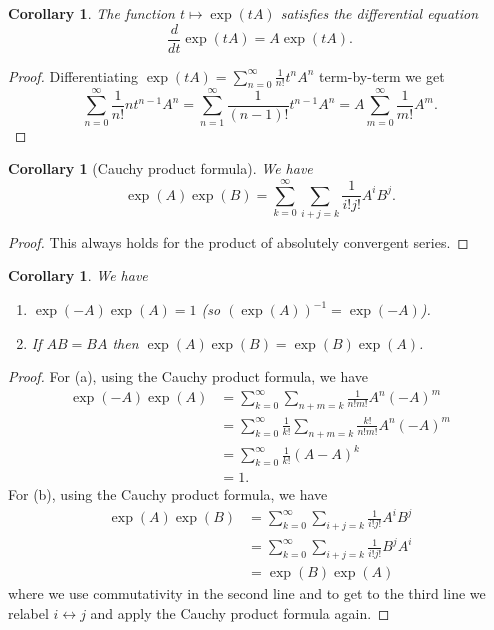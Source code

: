 \documentclass[12pt]{article}
\newtheorem{cor}[thm]{Corollary}
\theoremstyle{definition}
\theoremstyle{check}
\theoremstyle{remark}
\theoremstyle{TheoremNum}
\begin{document}
\begin{cor}
The function $t\mapsto \exp(tA)$ satisfies the differential equation
\[\frac{d}{dt}\exp(tA)=A\exp(tA).\]
\end{cor}
\begin{proof}
Differentiating $\exp(tA)=\sum_{n=0}^{\infty}\frac{1}{n!}t^nA^n$ term-by-term we get
\[\sum_{n=0}^{\infty}\frac{1}{n!}nt^{n-1}A^n=\sum_{n=1}^{\infty}\frac{1}{(n-1)!}t^{n-1}A^n=A\sum_{m=0}^{\infty}\frac{1}{m!}A^m.\]
\end{proof}

\begin{cor}[Cauchy product formula]
We have
\[\exp(A)\exp(B)=\sum_{k=0}^{\infty}\sum_{i+j=k}\frac{1}{i!j!}A^iB^j.\]
\end{cor}
\begin{proof}
This always holds for the product of absolutely convergent series.
\end{proof}

\begin{cor}
We have
\begin{enumerate}
\item[(a)] $\exp(-A)\exp(A)=1$ (so $(\exp(A))^{-1}=\exp(-A)$).
\item[(b)] If $AB=BA$ then $\exp(A)\exp(B)=\exp(B)\exp(A)$.
\end{enumerate}
\end{cor}
\begin{proof}
For (a), using the Cauchy product formula, we have
\begin{align*}
\exp(-A)\exp(A)&=\sum_{k=0}^{\infty}\sum_{n+m=k}\frac{1}{n!m!}A^n(-A)^m\\
               &=\sum_{k=0}^{\infty}\frac{1}{k!}\sum_{n+m=k}\frac{k!}{n!m!}A^n(-A)^m\\
               &=\sum_{k=0}^{\infty}\frac{1}{k!}(A-A)^k\\
               &=1.
\end{align*}
For (b), using the Cauchy product formula, we have
\begin{align*}
\exp(A)\exp(B)&=\sum_{k=0}^{\infty}\sum_{i+j=k}\frac{1}{i!j!}A^iB^j\\
              &=\sum_{k=0}^{\infty}\sum_{i+j=k}\frac{1}{i!j!}B^jA^i\\
              &=\exp(B)\exp(A)
\end{align*}
where we use commutativity in the second line and to get to the third line we relabel $i\leftrightarrow j$ and apply the Cauchy product formula again.
\end{proof}
\end{document}
